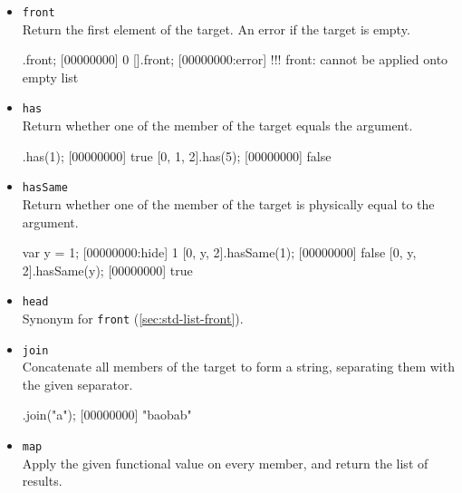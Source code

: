 \begin{itemize}

\begin{urbiscript}[firstnumber=last]

\end{urbiscript}

\item \lstinline|front|\\
\label{sec:std-list-front}
Return the first element of the target. An error if the target is
empty.

\begin{urbiscript}[firstnumber=last]
[0, 1, 2].front;
[00000000] 0
[].front;
[00000000:error] !!! front: cannot be applied onto empty list
\end{urbiscript}

\item \lstinline|has|\\
Return whether one of the member of the target equals the argument.

\begin{urbiscript}[firstnumber=last]
[0, 1, 2].has(1);
[00000000] true
[0, 1, 2].has(5);
[00000000] false
\end{urbiscript}

\item \lstinline|hasSame|\\

Return whether one of the member of the target is physically equal to
the argument.

\begin{urbiscript}[firstnumber=last]
var y = 1;
[00000000:hide] 1
[0, y, 2].hasSame(1);
[00000000] false
[0, y, 2].hasSame(y);
[00000000] true
\end{urbiscript}

\item \lstinline|head|\\
Synonym for \lstinline|front| (\autoref{sec:std-list-front}).

\item \lstinline|join|\\
Concatenate all members of the target to form a string, separating
them with the given separator.

\begin{urbiscript}[firstnumber=last]
["b", "ob", "b"].join("a");
[00000000] "baobab"
\end{urbiscript}

\item \lstinline|map|\\
Apply the given functional value on every member, and return the list
of results.


\end{itemize}
